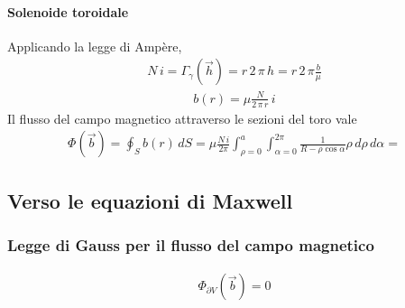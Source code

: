 \documentclass[letterpaper,10pt,italian]{jupyterBook}
\begin{document}
\paragraph{Solenoide toroidale}
\label{\detokenize{ch/electromagnetism/electromagnetism-steady:solenoide-toroidale}}
\sphinxAtStartPar
Applicando la legge di Ampère,
\begin{equation*}
\begin{split}N \, i = \Gamma_{\gamma}(\vec{h}) = r \, 2 \, \pi \, h = r \, 2 \, \pi \frac{b}{\mu}\end{split}
\end{equation*}\begin{equation*}
\begin{split}b(r) = \mu \frac{N}{2 \, \pi \, r } \, i\end{split}
\end{equation*}
\sphinxAtStartPar
Il flusso del campo magnetico attraverso le sezioni del toro vale
\begin{equation*}
\begin{split}\Phi(\vec{b}) = \oint_{S} b(r) \, dS =  \mu \frac{N \, i}{2 \pi}\int_{\rho=0}^{a} \int_{\alpha=0}^{2\pi} \frac{1}{R - \rho \cos \alpha} \rho \, d \rho \, d \alpha  = \end{split}
\end{equation*}
\sphinxAtStartPar
{}




\subsection{Verso le equazioni di Maxwell}
\label{\detokenize{ch/electromagnetism/electromagnetism-steady:verso-le-equazioni-di-maxwell}}

\subsubsection{Legge di Gauss per il flusso del campo magnetico}
\label{\detokenize{ch/electromagnetism/electromagnetism-steady:legge-di-gauss-per-il-flusso-del-campo-magnetico}}\begin{equation*}
\begin{split}\Phi_{\partial V}(\vec{b}) = 0\end{split}
\end{equation*}
\sphinxAtStartPar
{} 
\end{document}
